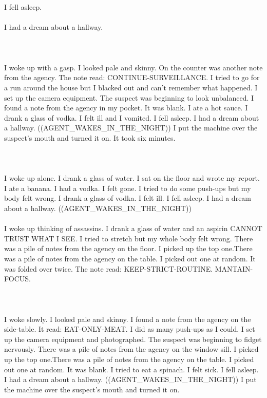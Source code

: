 \documentclass{article}
\begin{document}
    \section{}
    I fell asleep.\\\\I had a dream about a hallway.\\\\ 
    \newpage
    
    \section{}
    I woke up with a gasp. I looked pale and skinny. On the counter was another note from the agency. The note read: CONTINUE-SURVEILLANCE. I tried to go for a run around the house but I blacked out and can't remember what happened. I set up the camera equipment. The suspect was beginning to look unbalanced. I found a note from the agency in my pocket. It was blank. I ate a hot sauce. I drank a glass of vodka. I felt ill and I vomited. I fell asleep. I had a dream about a hallway. ((AGENT_WAKES_IN_THE_NIGHT)) I put the machine over the suspect's mouth and turned it on. It took six minutes. \\\\
    \newpage
    
    \section{}
    I woke up alone. I drank a glass of water. I sat on the floor and wrote my report. I ate a banana. I had a vodka. I felt gone. I tried to do some push-ups but my body felt wrong. I drank a glass of vodka. I felt ill. I fell asleep. I had a dream about a hallway. ((AGENT_WAKES_IN_THE_NIGHT)) \\\\I woke up thinking of assassins. I drank a glass of water and an aspirin CANNOT TRUST WHAT I SEE. I tried to stretch but my whole body felt wrong. There was a pile of notes from the agency on the floor. I picked up the top one.There was a pile of notes from the agency on the table. I picked out one at random. It was folded over twice. The note read: KEEP-STRICT-ROUTINE. MANTAIN-FOCUS. \\\\
    \newpage
    
    \section{}
    I woke slowly. I looked pale and skinny. I found a note from the agency on the side-table. It read: EAT-ONLY-MEAT. I did as many push-ups as I could. I set up the camera equipment and photographed. The suspect was beginning to fidget nervously. There was a pile of notes from the agency on the window sill. I picked up the top one.There was a pile of notes from the agency on the table. I picked out one at random. It was blank. I tried to eat a spinach. I felt sick. I fell asleep. I had a dream about a hallway. ((AGENT_WAKES_IN_THE_NIGHT)) I put the machine over the suspect's mouth and turned it on. \\\\
    \newpage
    
\end{document}
